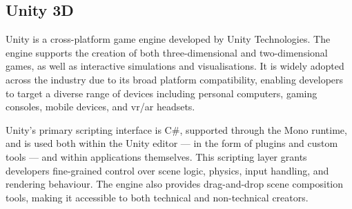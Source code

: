 \subsection{Unity 3D}\label{subsec:unity}

Unity is a cross-platform game engine developed by Unity Technologies.
The engine supports the creation of both three-dimensional and
two-dimensional games, as well as interactive simulations and
visualisations.
It is widely adopted across the industry due to its broad platform
compatibility, enabling developers to target a diverse range of devices
including personal computers, gaming consoles, mobile devices, and
\acrshort{vr}/\acrshort{ar} headsets.

Unity's primary scripting interface is C\#, supported through the Mono
runtime, and is used both within the Unity editor --- in the form of
plugins and custom tools --- and within applications themselves.
This scripting layer grants developers fine-grained control over scene
logic, physics, input handling, and rendering behaviour.
The engine also provides drag-and-drop scene composition tools,
making it accessible to both technical and non-technical creators.
